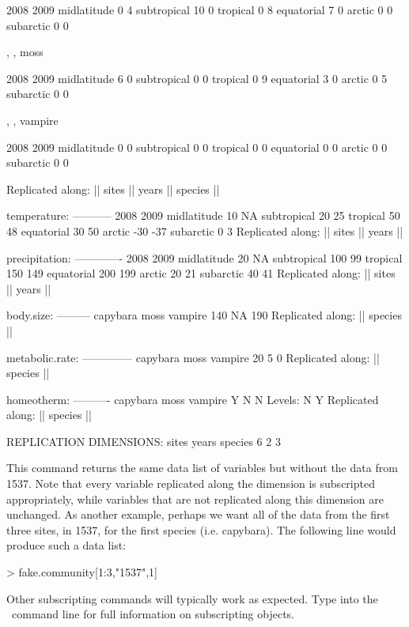 \documentclass[a4paper]{report}
\begin{document}
\begin{article}
\begin{Schunk}
\begin{Soutput}
            2008 2009
midlatitude    0    4
subtropical   10    0
tropical       0    8
equatorial     7    0
arctic         0    0
subarctic      0    0

, , moss

            2008 2009
midlatitude    6    0
subtropical    0    0
tropical       0    9
equatorial     3    0
arctic         0    5
subarctic      0    0

, , vampire

            2008 2009
midlatitude    0    0
subtropical    0    0
tropical       0    0
equatorial     0    0
arctic         0    0
subarctic      0    0

Replicated along:  || sites || years || species || 


temperature:
-----------
            2008 2009
midlatitude   10   NA
subtropical   20   25
tropical      50   48
equatorial    30   50
arctic       -30  -37
subarctic      0    3
Replicated along:  || sites || years || 


precipitation:
-------------
            2008 2009
midlatitude   20   NA
subtropical  100   99
tropical     150  149
equatorial   200  199
arctic        20   21
subarctic     40   41
Replicated along:  || sites || years || 


body.size:
---------
capybara     moss  vampire 
     140       NA      190 
Replicated along:  || species || 


metabolic.rate:
--------------
capybara     moss  vampire 
      20        5        0 
Replicated along:  || species || 


homeotherm:
----------
capybara     moss  vampire 
       Y        N        N 
Levels: N Y
Replicated along:  || species || 


REPLICATION DIMENSIONS: 
  sites   years species 
      6       2       3 
\end{Soutput}
\end{Schunk}
This command returns the same data list of variables but without the data from 1537.  Note that every variable replicated along the  dimension is subscripted appropriately, while variables that are not replicated along this dimension are unchanged.  As another example, perhaps we want all of the data from the first three sites, in 1537, for the first species (i.e. capybara).  The following line would produce such a data list:
\begin{Schunk}
\begin{Sinput}
> fake.community[1:3,"1537",1]
\end{Sinput}
\end{Schunk}
Other subscripting commands will typically work as expected.  Type  into the \R\ command line for full information on subscripting  objects.


\end{article}
\end{document}

